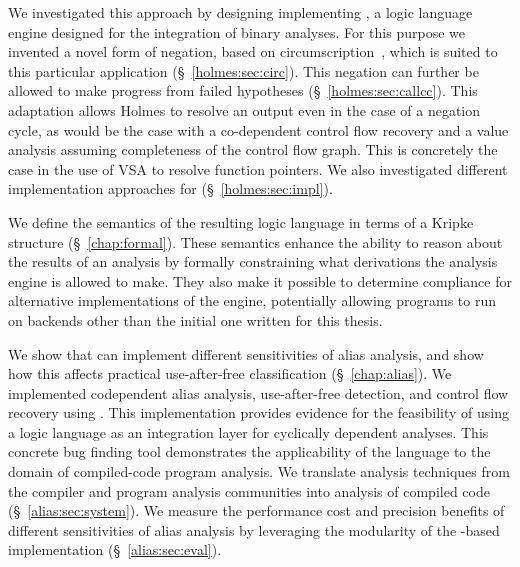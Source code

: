 We investigated this approach by designing implementing \sysname, a logic language engine designed for the integration of binary analyses.
For this purpose we invented a novel form of negation, based on circumscription~\cite{circumscription}, which is suited to this particular application (\S~\ref{holmes:sec:circ}).
This negation can further be allowed to make progress from failed hypotheses (\S~\ref{holmes:sec:callcc}).
This adaptation allows Holmes to resolve an output even in the case of a negation cycle, as would be the case with a co-dependent control flow recovery and a value analysis assuming completeness of the control flow graph.
This is concretely the case in the use of VSA to resolve function pointers.
We also investigated different implementation approaches for \sysname (\S~\ref{holmes:sec:impl}).

We define the semantics of the resulting logic language in terms of a Kripke structure (\S~\ref{chap:formal}).
These semantics enhance the ability to reason about the results of an analysis by formally constraining what derivations the analysis engine is allowed to make.
They also make it possible to determine compliance for alternative implementations of the engine, potentially allowing programs to run on backends other than the initial one written for this thesis.

We show that \sysname can implement different sensitivities of alias analysis, and show how this affects practical use-after-free classification (\S~\ref{chap:alias}).
We implemented codependent alias analysis, use-after-free detection, and control flow recovery using \sysname.
This implementation provides evidence for the feasibility of using a logic language as an integration layer for cyclically dependent analyses.
This concrete bug finding tool demonstrates the applicability of the \sysname language to the domain of compiled-code program analysis.
We translate analysis techniques from the compiler and program analysis communities into analysis of compiled code (\S~\ref{alias:sec:system}).
We measure the performance cost and precision benefits of different sensitivities of alias analysis by leveraging the modularity of the \sysname-based implementation (\S~\ref{alias:sec:eval}).

